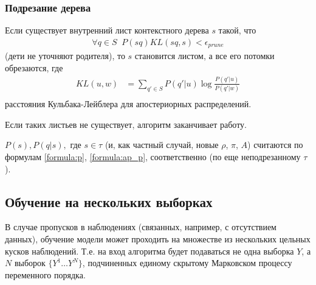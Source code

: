 \documentclass{matmex-diploma-custom}
\begin{document}
\subsubsection{Подрезание дерева} 
Если существует внутренний лист контекстного дерева $ s $ такой, что 
\begin{align}
\forall q \in S \;\; P(sq)\textit{KL}(sq, s) < \epsilon_{\textit{prune}} 
\end{align}
(дети не уточняют родителя), то $ s $ становится листом, а все его потомки обрезаются, где
\begin{align}
\textit{KL}(u, w) &= \sum_{q' \in S} P(q'|u) \log\frac{P(q'|u)}{P(q'|w)}\\
\end{align}
расстояния Кульбака-Лейблера для апостериорных распределений.

Если таких листьев не существует, алгоритм заканчивает работу.

$P(s), P(q|s), \text{ где } s \in \tau$ (и, как частный случай, новые $\rho$, $\pi$, $ A $) считаются по формулам \ref{formula:p}, \ref{formula:ap_p}, соответственно (по еще неподрезанному $\tau$).

\subsection{Обучение на нескольких выборках}
В случае пропусков в наблюдениях (связанных, например, с отсутствием данных), обучение модели может проходить на множестве из нескольких цельных кусков наблюдений.
Т.е. на вход алгоритма будет подаваться не одна выборка $Y$, а                                                                                                                                                                                                                                                                                                                                                                                                                                                                                                                                                                                                                                                              $ N $ выборок $ \{Y^{1} \ldots Y^{N}\}$, подчиненных единому скрытому Марковском процессу переменного порядка.
\end{document}
